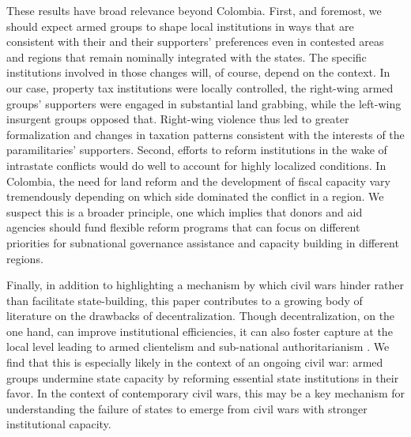 These results have broad relevance beyond Colombia. First, and foremost, we should expect armed groups to shape local institutions in ways that are consistent with their and their supporters' preferences even in contested areas and regions that remain nominally integrated with the states. The specific institutions involved in those changes will, of course, depend on the context. In our case, property tax institutions were locally controlled, the right-wing armed groups' supporters were engaged in substantial land grabbing, while the left-wing insurgent groups opposed that. Right-wing violence thus led to greater formalization and changes in taxation patterns consistent with the interests of the paramilitaries' supporters. Second, efforts to reform institutions in the wake of intrastate conflicts would do well to account for highly localized conditions. In Colombia, the need for land reform and the development of fiscal capacity vary tremendously depending on which side dominated the conflict in a region. We suspect this is a broader principle, one which implies that donors and aid agencies should fund flexible reform programs that can focus on different priorities for subnational governance assistance and capacity building in different regions.

Finally, in addition to highlighting a mechanism by which civil wars hinder rather than facilitate state-building, this paper contributes to a growing body of literature on the drawbacks of decentralization. Though decentralization, on the one hand, can improve institutional efficiencies, it can also foster capture at the local level leading to armed clientelism \citep{eaton06a} and sub-national authoritarianism \citep{gibson05a, diaz-cayeros06a}. We find that this is especially likely in the context of an ongoing civil war: armed groups undermine state capacity by reforming essential state institutions in their  favor. In the context of contemporary civil wars, this may be a key mechanism for understanding the failure of states to emerge from civil wars with stronger institutional capacity. 




